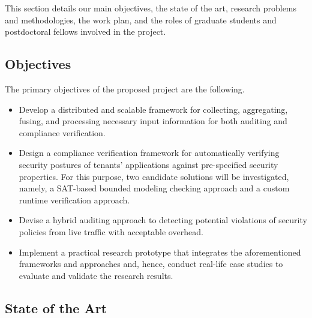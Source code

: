 \documentclass[12pt]{article}
\begin{document}
This section details our main objectives, the state of the art,
research problems and methodologies, the work plan, and
the roles of graduate students and postdoctoral fellows involved in
the project.

\vspace{-3mm}
\subsection{Objectives}
\vspace{-2mm}

The primary objectives of the proposed project are the following.

\vspace{-3mm}
\begin{itemize}
\addtolength{\itemsep}{-0.5\baselineskip}

\item Develop a distributed and scalable framework for collecting,
  aggregating, fusing, and processing necessary input information for
  both auditing and compliance verification.

\item Design a compliance verification framework for automatically
  verifying security postures of tenants' applications against
  pre-specified security properties. For this purpose, two candidate
  solutions will be investigated, namely, a SAT-based bounded modeling
  checking approach and a custom runtime verification approach.

\item Devise a hybrid auditing approach to detecting potential
  violations of security policies from live traffic with acceptable
  overhead.

\item Implement a practical research prototype that integrates the
  aforementioned frameworks and approaches and, hence, conduct
  real-life case studies to evaluate and validate the research
  results.
\end{itemize}

\vspace{-8mm}
\subsection{State of the Art}
\vspace{-2mm}
\label{sec:state}
\end{document}
